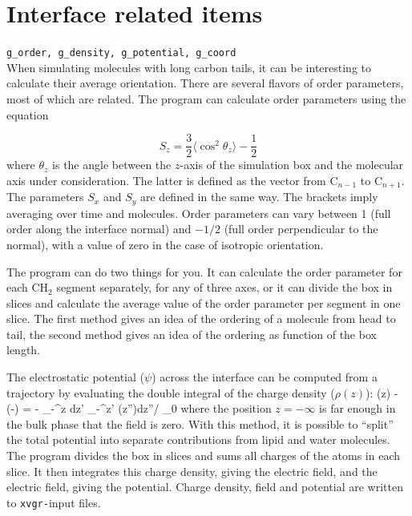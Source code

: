 {%

\section{Interface related items}
{\tt g\_order, g\_density, g\_potential, g\_coord}\\
When simulating molecules with long carbon tails, it can be
interesting to calculate their average orientation. There are several
flavors of order parameters, most of which are related. The program
{\tt {}} can calculate order parameters using the equation

\begin{equation}
S_{z} = \frac{3}{2}\langle {\cos^2{\theta_z}} \rangle - \frac{1}{2}
\label{eqn:Sgr}
\end{equation}
where $\theta_z$ is the angle between the $z$-axis of the simulation
box and the molecular axis under consideration. The latter is defined as the
vector from C$_{n-1}$ to C$_{n+1}$. The parameters $S_x$
and $S_y$ are defined in the same way. The brackets imply averaging over time
and molecules. Order parameters can vary between 1 (full order along
the interface normal) and $-1/2$ (full order perpendicular to the
normal), with a value of zero in the case of isotropic orientation.

The program can do two things for you. It can calculate the order
parameter for each CH$_2$ segment separately, for any of three axes,
or it can divide the box in slices and calculate the average value of
the order parameter per segment in one slice. The first method gives
an idea of the ordering of a molecule from head to tail, the second
method gives an idea of the ordering as function of the box length.

The electrostatic potential ($\psi$) across the interface can be
computed from a trajectory by evaluating the double integral of the
charge density ($\rho(z)$):
\beq
\psi(z) - \psi(-\infty) = - \int_{-\infty}^z dz' \int_{-\infty}^{z'} \rho(z'')dz''/ \epsilon_0 
\label{eqn:elpotgr}
\eeq
where the position $z=-\infty$ is far enough in the bulk phase that
the field is zero.  With this method, it is possible to ``split'' the
total potential into separate contributions from lipid and water
molecules. The program {\tt {}} divides the box in slices and
sums all charges of the atoms in each slice. It then integrates this
charge density, giving the electric field, and the electric field,
giving the potential. Charge density, field and potential are written
to {\tt xvgr-}input files.

}
